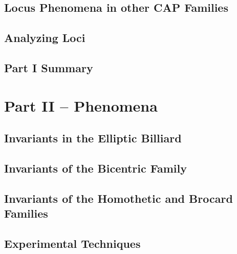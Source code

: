\documentclass{book}
\begin{document}
\chapter[Loci in CAP Pairs]{Locus Phenomena in other CAP Families}
\label{chap:04-cap-loci}


\chapter{Analyzing Loci}
\label{chap:04-n3-loci}


%

\chapter{Part I Summary}
\label{chap:08-partI-summary}


\part{Part II --  Phenomena}

\chapter[Billiard Invariants]{Invariants in the Elliptic Billiard}
\label{chap:05-billiard}
  

\chapter[Bicentric Invariants]{Invariants of the Bicentric Family}
\label{chap:06-bicentric}
%

\chapter[Homothetic and Brocard Invariants]{Invariants of the Homothetic and Brocard Families}
\label{chap:07-homoth}
%

\chapter{Experimental Techniques}
\label{chap:08-experimental}
%
\end{document}
